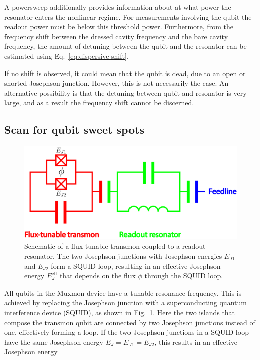         A powersweep additionally provides information about at what power the resonator enters the nonlinear regime. For measurements involving the qubit the readout power must be below this threshold power. Furthermore, from the frequency shift between the dressed cavity frequency and the bare cavity frequency, the amount of detuning between the qubit and the resonator can be estimated using Eq.~\ref{eq:dispersive-shift}.

        If no shift is observed, it could mean that the qubit is dead, due to an open or shorted Josephson junction. However, this is not necessarily the case. An alternative possibility is that the detuning between qubit and resonator is very large, and as a result the frequency shift cannot be discerned.

      \subsection{Scan for qubit sweet spots}
        \label{Scan for qubit sweet spots}

        \begin{figure}[tb]
          \centering
          \includegraphics[width=.7\textwidth]{Figures/Qubit characterization/flux-tunable transmon schematic joined.jpg}
          \caption{Schematic of a flux-tunable transmon coupled to a readout resonator. The two Josephson junctions with Josephson energies $E_{J1}$ and $E_{J2}$ form a SQUID loop, resulting in an effective Josephson energy $E_J^\text{eff}$ that depends on the flux $\phi$ through the SQUID loop.}
          \label{fig:flux-tunable transmon schematic}
        \end{figure}
        All qubits in the Muxmon device have a tunable resonance frequency. This is achieved by replacing the Josephson junction with a superconducting quantum interference device (SQUID), as shown in Fig.~\ref{fig:flux-tunable transmon schematic}. Here the two islands that compose the transmon qubit are connected by two Josephson junctions instead of one, effectively forming a loop. If the two Josephson junctions in a SQUID loop have the same Josephson energy $E_J=E_{J1}=E_{J2}$, this results in an effective Josephson energy~\cite[pp.54-56]{Reed}

